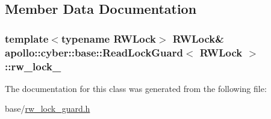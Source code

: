 \subsection{Member Data Documentation}
\hypertarget{classapollo_1_1cyber_1_1base_1_1ReadLockGuard_a825989e830a9f6ffcd2d1946ef899580}{
\subsubsection[{rw\-\_\-lock\-\_\-}]{\setlength{\rightskip}{0pt plus 5cm}template$<$typename R\-W\-Lock$>$ R\-W\-Lock\& {\bf apollo\-::cyber\-::base\-::\-Read\-Lock\-Guard}$<$ R\-W\-Lock $>$\-::rw\-\_\-lock\-\_\-\hspace{0.3cm}{\ttfamily [private]}}}\label{classapollo_1_1cyber_1_1base_1_1ReadLockGuard_a825989e830a9f6ffcd2d1946ef899580}


The documentation for this class was generated from the following file\-:\begin{DoxyCompactItemize}
\item 
base/\hyperlink{rw__lock__guard_8h}{rw\-\_\-lock\-\_\-guard.\-h}\end{DoxyCompactItemize}
